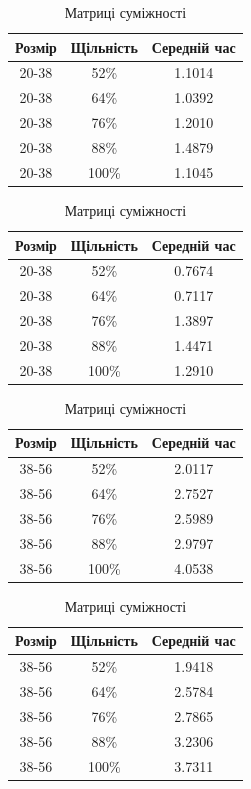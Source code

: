 \documentclass[titlepage, a4paper]{article}
\begin{document}
\begin{table}[htbp]
\begin{minipage}[b]{0.5\linewidth}
\begin{tabular}{|c|c|c|}
\hline
Розмір & Щільність & Середній час\\
\hline
20-38 & 52\% & 1.1014 \\
20-38 & 64\% & 1.0392 \\
20-38 & 76\% & 1.2010 \\
20-38 & 88\% & 1.4879 \\
20-38 & 100\% & 1.1045 \\
\hline
\end{tabular}
\caption{Списки суміжності}
\end{minipage}
\begin{minipage}[b]{0.5\linewidth}
\begin{tabular}{|c|c|c|}
\hline
Розмір & Щільність & Середній час\\
\hline
20-38 & 52\% & 0.7674 \\
20-38 & 64\% & 0.7117 \\
20-38 & 76\% & 1.3897 \\
20-38 & 88\% & 1.4471 \\
20-38 & 100\% & 1.2910 \\
\hline
\end{tabular}
\caption{Матриці суміжності}
\end{minipage}
\end{table}
\begin{table}[htbp]
\begin{minipage}[b]{0.5\linewidth}
\begin{tabular}{|c|c|c|}
\hline
Розмір & Щільність & Середній час\\
\hline
38-56 & 52\% & 2.0117 \\
38-56 & 64\% & 2.7527 \\
38-56 & 76\% & 2.5989 \\
38-56 & 88\% & 2.9797 \\
38-56 & 100\% & 4.0538 \\
\hline
\end{tabular}
\caption{Списки суміжності}
\end{minipage}
\begin{minipage}[b]{0.5\linewidth}
\begin{tabular}{|c|c|c|}
\hline
Розмір & Щільність & Середній час\\
\hline
38-56 & 52\% & 1.9418 \\
38-56 & 64\% & 2.5784 \\
38-56 & 76\% & 2.7865 \\
38-56 & 88\% & 3.2306 \\
38-56 & 100\% & 3.7311 \\
\hline
\end{tabular}
\caption{Матриці суміжності}
\end{minipage}
\end{table}
\end{document}
